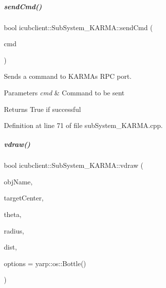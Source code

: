 \mbox{\label{group__icubclient__subsystems_acf93003113c4db21fe8717a2da168bd5}} 
\subparagraph{\texorpdfstring{send\+Cmd()}{sendCmd()}}
{\footnotesize\ttfamily bool icubclient\+::\+Sub\+System\+\_\+\+K\+A\+R\+M\+A\+::send\+Cmd (\begin{DoxyParamCaption}\item[{yarp\+::os\+::\+Bottle \&}]{cmd }\end{DoxyParamCaption})\hspace{0.3cm}{\ttfamily [protected]}}



Sends a command to K\+A\+R\+MA\textquotesingle{}s R\+PC port. 


\begin{DoxyParams}{Parameters}
{\em cmd} & Command to be sent \\
\hline
\end{DoxyParams}
\begin{DoxyReturn}{Returns}
True if successful 
\end{DoxyReturn}


Definition at line 71 of file sub\+System\+\_\+\+K\+A\+R\+M\+A.\+cpp.

\mbox{\label{group__icubclient__subsystems_aaba06999b553acfd343004d1116b0111}} 
\subparagraph{\texorpdfstring{vdraw()}{vdraw()}}
{\footnotesize\ttfamily bool icubclient\+::\+Sub\+System\+\_\+\+K\+A\+R\+M\+A\+::vdraw (\begin{DoxyParamCaption}\item[{const std\+::string \&}]{obj\+Name,  }\item[{const yarp\+::sig\+::\+Vector\+Of$<$ double $>$ \&}]{target\+Center,  }\item[{const double}]{theta,  }\item[{const double}]{radius,  }\item[{const double}]{dist,  }\item[{const yarp\+::os\+::\+Bottle \&}]{options = {\ttfamily yarp\+:\+:os\+:\+:Bottle()} }\end{DoxyParamCaption})}



